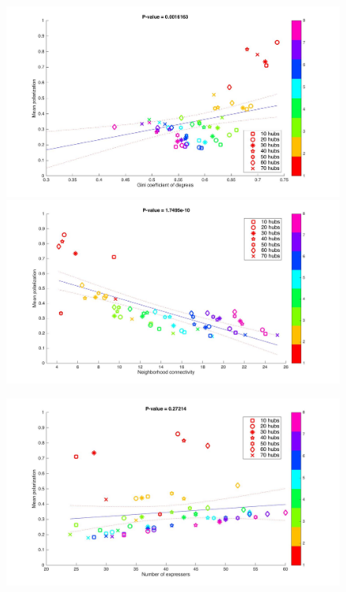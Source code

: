 \documentclass{article}
\begin{document}
\begin{figure}
\hspace{-1.5cm}
\includegraphics[scale=0.20]{img/reg4.jpg}
\hspace{-1.2cm} 
\includegraphics[scale=0.20]{img/reg8.jpg}
\caption{}
\label{reg4}
\end{figure}

\begin{figure}
\centering
\includegraphics[scale=0.20]{img/reg9.jpg}
\caption{}
\label{reg5}
\end{figure}
\end{document}
